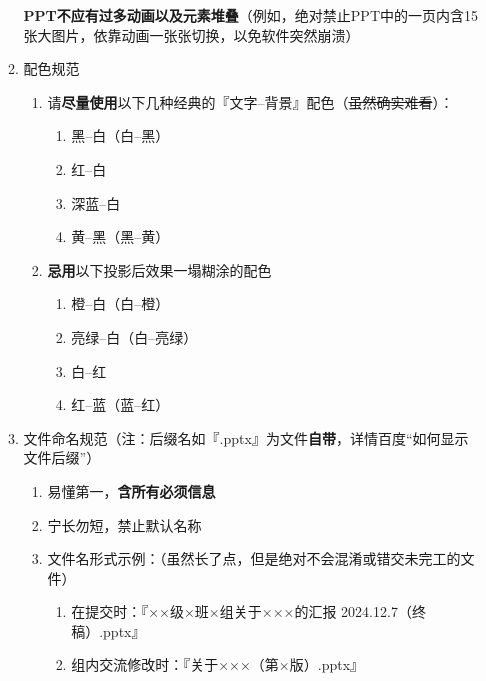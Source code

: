 \begin{enumerate}
\begin{enumerate}
                    \textbf{PPT不应有过多动画以及元素堆叠}（例如，绝对禁止PPT中的一页内含15张大图片，依靠动画一张张切换，以免软件突然崩溃）
              \item 配色规范
                    \begin{enumerate}
                        \item 请\textbf{尽量使用}以下几种经典的『文字--背景』配色（\st{虽然确实难看}）：
                              \begin{enumerate}
                                  \item 黑--白（白--黑）
                                  \item 红--白
                                  \item 深蓝--白
                                  \item 黄--黑（黑--黄）
                              \end{enumerate}
                        \item \textbf{忌用}以下投影后效果一塌糊涂的配色
                              \begin{enumerate}
                                  \item 橙--白（白--橙）
                                  \item 亮绿--白（白--亮绿）
                                  \item 白--红
                                  \item 红--蓝（蓝--红）
                              \end{enumerate}
                    \end{enumerate}
              \item 文件命名规范（注：后缀名如『.pptx』为文件\textbf{自带}，详情百度“如何显示文件后缀”）
                    \begin{enumerate}
                        \item 易懂第一，\textbf{含所有必须信息}
                        \item 宁长勿短，禁止默认名称
                        \item 文件名形式示例：（虽然长了点，但是绝对不会混淆或错交未完工的文件）
                              \begin{enumerate}
                                  \item 在提交时：『××级×班×组关于×××的汇报 2024.12.7（终稿）.pptx』
                                  \item 组内交流修改时：『关于×××（第×版）.pptx』

\end{enumerate}
\end{enumerate}
\end{enumerate}
\end{enumerate}

